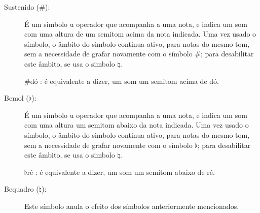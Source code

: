 \begin{description}

\item [Sustenido ($\#$):] \label{sec:pos:Sustenido}
É um simbolo u operador que acompanha a uma nota, 
e indica um som com uma altura de um semitom acima da nota indicada.
Uma vez usado o símbolo, o âmbito  do simbolo continua ativo, 
para notas do mesmo tom, sem a necessidade de grafar novamente com o símbolo $\#$;
para desabilitar este âmbito, se usa o simbolo $\natural$. 
\begin{example} $\#$dó : é equivalente a dizer, um som um semitom acima de dó.
\end{example}


\item [Bemol ($\flat$):] \label{sec:pos:Bemol}
É um simbolo u operador que acompanha a uma nota, 
e indica um som com uma altura um semitom abaixo da nota indicada. 
Uma vez usado o símbolo, o âmbito  do simbolo continua ativo, 
para notas do mesmo tom, sem a necessidade de grafar novamente com o símbolo $\flat$;
para desabilitar este âmbito, se usa o simbolo $\natural$. 
\begin{example} $\flat$ré : é equivalente a dizer, um som um semitom abaixo de ré.
\end{example}

\item [Bequadro ($\natural$):] \label{sec:pos:Bequadro}
Este símbolo anula o efeito dos símbolos anteriormente mencionados.

\end{description}~\\

